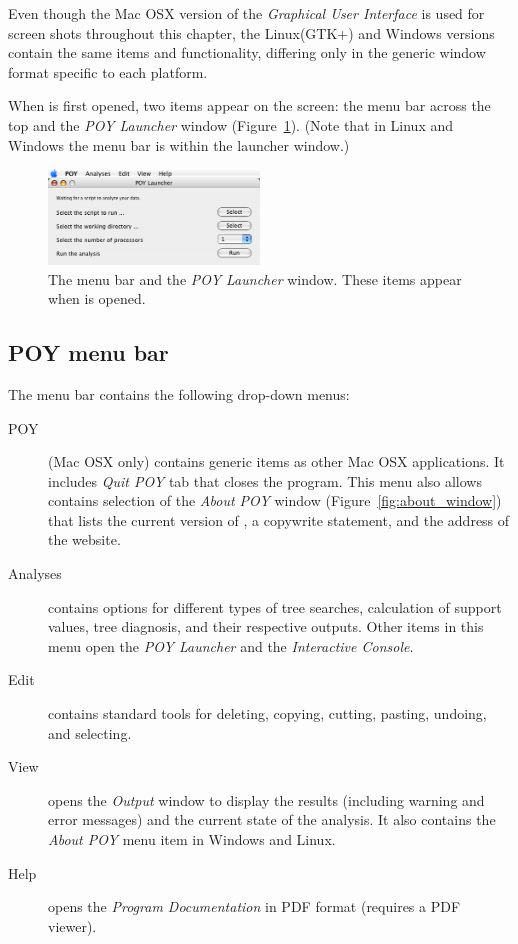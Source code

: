 Even though the Mac OSX version of the \emph{Graphical User Interface} is used for screen shots throughout this chapter, the Linux(GTK+) and Windows versions contain the same items and functionality, differing only in the generic window format specific to each platform.

When \poy is first opened, two items appear on the screen: the menu bar across the top and the \emph{POY Launcher} window (Figure~\ref{fig:menu_launcher_window}). (Note that in Linux and Windows the menu bar is within the launcher window.)

\begin{figure}[htpb]
    \begin{center}
        \includegraphics[width=0.5\textwidth]{figures/menu_launcher_window.jpg}
    \end{center}
    \caption{The \poy menu bar and the \emph{POY Launcher} window. These items appear when \poy is opened.}
    \label{fig:menu_launcher_window}
\end{figure}

\subsection{POY menu bar}
The menu bar contains the following drop-down menus:
\begin{description}
\item[POY] (Mac OSX only) contains generic items as other Mac OSX applications. It includes \emph{Quit POY} tab that closes the program. This menu also allows contains selection of the \emph{About POY} window (Figure~\ref{fig:about_window}) that lists the current version of \poy, a copywrite statement, and the address of the \poy website.
\item[Analyses] contains options for different types of tree searches, calculation of support values, tree diagnosis, and their respective outputs. Other items in this menu open the \emph{POY Launcher} and the \emph{Interactive Console}.
\item[Edit] contains standard tools for deleting, copying, cutting, pasting, undoing, and selecting.
\item[View] opens the \emph{Output} window to display the results (including warning and error messages) and the current state of the analysis. It also contains the \emph{About POY} menu item in Windows and Linux.
\item[Help] opens the \poy \emph{Program Documentation} in PDF format (requires a PDF viewer).
\end{description}

